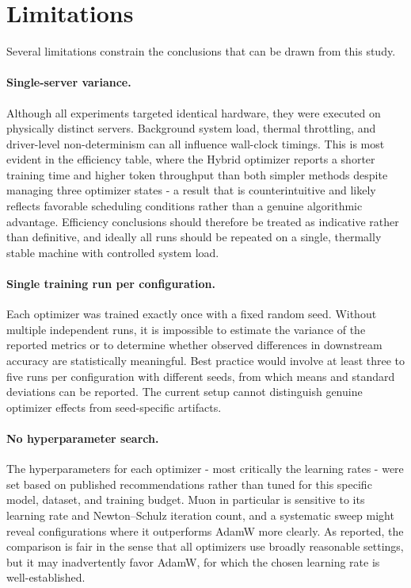 \documentclass[11pt,a4paper]{article}
\begin{document}
\section{Limitations}
Several limitations constrain the conclusions that can be drawn from this study.


\paragraph{Single-server variance.}
Although all experiments targeted identical hardware,
they were executed on physically distinct servers.
Background system load, thermal throttling, and driver-level
non-determinism can all influence wall-clock timings. This is most evident in
the efficiency table, where the Hybrid optimizer reports a shorter training time
and higher token throughput than both simpler methods despite managing three
optimizer states - a result that is counterintuitive and likely reflects
favorable scheduling conditions rather than a genuine algorithmic advantage.
Efficiency conclusions should therefore be treated as indicative rather than
definitive, and ideally all runs should be repeated on a single, thermally
stable machine with controlled system load.

\paragraph{Single training run per configuration.}
Each optimizer was trained exactly once
with a fixed random seed. Without multiple independent runs, it is impossible to
estimate the variance of the reported metrics or to determine whether observed
differences in downstream accuracy are statistically meaningful. Best practice
would involve at least three to five runs per configuration with different seeds,
from which means and standard deviations can be reported. The current setup cannot
distinguish genuine optimizer effects from seed-specific artifacts.

\paragraph{No hyperparameter search.}
The hyperparameters for each optimizer - most
critically the learning rates - were set based on published recommendations
rather than tuned for this specific model, dataset, and training budget.
Muon in particular is sensitive to its learning rate and Newton–Schulz iteration
count, and a systematic sweep might reveal configurations where it outperforms
AdamW more clearly. As reported, the comparison is fair in the sense that all
optimizers use broadly reasonable settings, but it may inadvertently favor AdamW,
for which the chosen learning rate is well-established.
\end{document}
